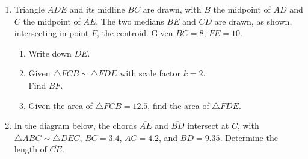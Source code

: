 \documentclass[12pt, twoside]{article}
\begin{document}
\begin{enumerate}
\item Triangle $ADE$ and its midline $\overline{BC}$ are drawn, with $B$ the midpoint of $\overline{AD}$ and $C$ the midpoint of $\overline{AE}$. The two medians $\overline{BE}$ and $\overline{CD}$ are drawn, as shown, intersecting in point $F$, the centroid. Given $BC=8$, $FE=10$.
\begin{multicols}{2}
  \begin{enumerate}[itemsep=1.5cm]
    \item Write down $DE$.
    \item Given $\triangle FCB \sim \triangle FDE$ with scale factor $k=2$. \\[0.5cm]
     Find $BF$.
     \item Given the area of $\triangle FCB = 12.5$, find the area of $\triangle FDE$.
  \end{enumerate}
  \begin{center}
  \end{center}
\end{multicols}
 \vspace{1cm}

\newpage
\item In the diagram below, the chords $\overline{AE}$ and $\overline{BD}$ intersect at $C$, with $\triangle ABC \sim \triangle DEC$, $BC=3.4$, $AC=4.2$, and $BD=9.35$. Determine the length of $\overline{CE}$.
    \begin{center}
  \end{center} \vspace{2cm}


\end{enumerate}
\end{document}
